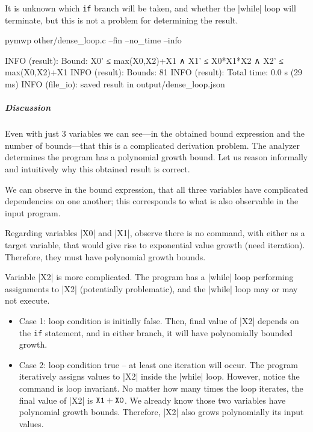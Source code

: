 It is unknown which \texttt{if} branch will be taken, and whether the \pr|while| loop will terminate, but this is not a problem for determining the result.

\begin{center}
\begin{minipage}{\textwidth}
\begin{cmdlisting}[label={lst:ex5-run-cmd}]
pymwp other/dense_loop.c --fin --no_time --info
\end{cmdlisting}
\end{minipage}
\end{center}

\begin{center}
\begin{minipage}{\textwidth}
\begin{outlisting}[label={lst:ex5-output}]
INFO (result): Bound: X0' ≤ max(X0,X2)+X1 ∧ X1' ≤ X0*X1*X2 ∧ X2' ≤ max(X0,X2)+X1
INFO (result): Bounds: 81
INFO (result): Total time: 0.0 s (29 ms)
INFO (file_io): saved result in output/dense_loop.json
\end{outlisting}
\end{minipage}
\end{center}

\subparagraph*{Discussion}
Even with just 3 variables we can see---in the obtained bound expression and the number of bounds---that this is a complicated derivation problem.
The analyzer determines the program has a polynomial growth bound.
Let us reason informally and intuitively why this obtained result is correct.

We can observe in the bound expression, that all three variables have complicated dependencies on one another;
this corresponds to what is also observable in the input program.

Regarding variables \pr|X0| and \pr|X1|, observe there is no command, with either as a target variable, that would give rise to exponential value growth (need iteration).
Therefore, they must have polynomial growth bounds.

Variable \pr|X2| is more complicated.
The program has a \pr|while| loop performing assignments to \pr|X2| (potentially problematic), and the \pr|while| loop may or may not execute.

\begin{itemize}

\item Case 1: loop condition is initially false.
Then, final value of \pr|X2| depends on the \texttt{if} statement, and in either branch, it will have polynomially bounded growth.

\item Case 2: loop condition true -- at least one iteration will occur.
The program iteratively assigns values to \pr|X2| inside the \pr|while| loop.
However, notice the command is loop invariant.
No matter how many times the loop iterates, the final value of \pr|X2| is \(\prm{X1} + \prm{X0}\).
We already know those two variables have polynomial growth bounds.
Therefore, \pr|X2| also grows polynomially \wrt its input values.

\end{itemize}

